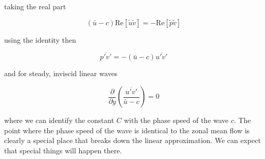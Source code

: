 taking the real part

\[(\bar{u}-c)\mathrm{Re}\left[ \tilde{u}\tilde{v}\right] = -\mathrm{Re}\left[ \tilde{p}\tilde{v}\right]\]

using the identity then

{\[\overline{p'v'} = -(\bar{u}-c) \overline{u'v'}\]}

and for steady, inviscid linear waves

\[\frac{\partial }{\partial y}\left( \frac{\overline{u'v'}}{\bar{u}- c}\right)=0\]

where we can identify the constant \(C\) with the phase speed of the
wave \(c\). The point where the phase speed of the wave is identical to
the zonal mean flow is clearly a special place that breaks down the
linear approximation. We can expect that special things will happen
there.
